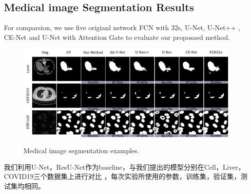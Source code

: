 \documentclass{ieeeaccess}
\begin{document}
\subsection{Medical image Segmentation Results}
For comparsion, we use five origianl network FCN with 32s\cite{fcn}, U-Net\cite{unet}, U-Net++\cite{unet++} , CE-Net\cite{cenet} and U-Net with Attention Gate\cite{attentiongate}
to evaluate our proposaed method. 
\begin{figure}[htbp]
  \begin{center}
  \includegraphics[width=0.99\textwidth]{figure/result.pdf}
  \vspace{-2mm}
  \caption{Medical image segmentation examples.} 
  \vspace{-2mm}
  \label{fig:result}
  \end{center}
  \vspace{-0.35cm}
\end{figure}

我们利用U-Net，ResU-Net作为baseline，与我们提出的模型分别在Cell，Liver，COVID19三个数据集上进行对比
，每次实验所使用的参数，训练集，验证集，测试集均相同。
\end{document}
